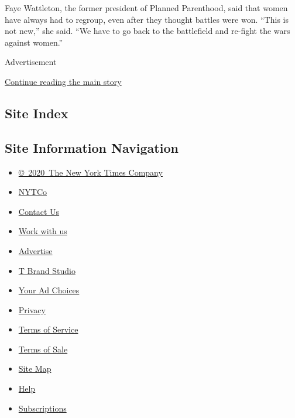Faye Wattleton, the former president of Planned Parenthood, said that
women have always had to regroup, even after they thought battles were
won. ``This is not new,'' she said. ``We have to go back to the
battlefield and re-fight the wars against women.''

Advertisement

\protect\hyperlink{after-bottom}{Continue reading the main story}

\hypertarget{site-index}{%
\subsection{Site Index}\label{site-index}}

\hypertarget{site-information-navigation}{%
\subsection{Site Information
Navigation}\label{site-information-navigation}}

\begin{itemize}
\tightlist
\item
  \href{https://help.nytimes.com/hc/en-us/articles/115014792127-Copyright-notice}{©~2020~The
  New York Times Company}
\end{itemize}

\begin{itemize}
\tightlist
\item
  \href{https://www.nytco.com/}{NYTCo}
\item
  \href{https://help.nytimes.com/hc/en-us/articles/115015385887-Contact-Us}{Contact
  Us}
\item
  \href{https://www.nytco.com/careers/}{Work with us}
\item
  \href{https://nytmediakit.com/}{Advertise}
\item
  \href{http://www.tbrandstudio.com/}{T Brand Studio}
\item
  \href{https://www.nytimes.com/privacy/cookie-policy\#how-do-i-manage-trackers}{Your
  Ad Choices}
\item
  \href{https://www.nytimes.com/privacy}{Privacy}
\item
  \href{https://help.nytimes.com/hc/en-us/articles/115014893428-Terms-of-service}{Terms
  of Service}
\item
  \href{https://help.nytimes.com/hc/en-us/articles/115014893968-Terms-of-sale}{Terms
  of Sale}
\item
  \href{https://spiderbites.nytimes.com}{Site Map}
\item
  \href{https://help.nytimes.com/hc/en-us}{Help}
\item
  \href{https://www.nytimes.com/subscription?campaignId=37WXW}{Subscriptions}
\end{itemize}
